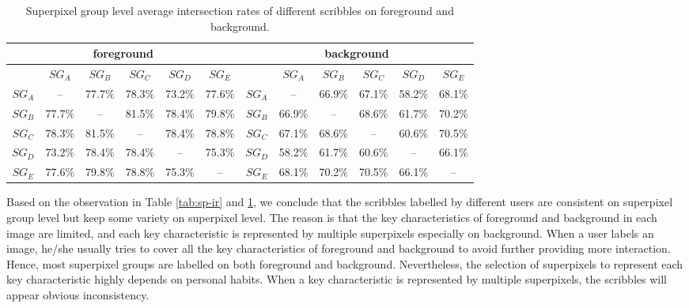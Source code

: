 \documentclass[runningheads,a4paper]{llncs}
\begin{document}
\begin{table}[!h]
\centering
\vspace{-0.2cm}
\caption{Superpixel group level average intersection rates of different scribbles on foreground and background.}
\begin{tabular}{c|c|c|c|c|c||c|c|c|c|c|c}
\hline
\multicolumn{6}{c||}{foreground} &\multicolumn{6}{c}{background}\\
\hline
& $SG_{A}$ & $SG_{B}$ & $SG_{C}$ & $SG_{D}$ & $SG_{E}$ && $SG_{A}$ & $SG_{B}$ & $SG_{C}$ & $SG_{D}$ & $SG_{E}$ \\
\hline
$SG_{A}$ & -- & 77.7\% & 78.3\% & 73.2\% & 77.6\% & $SG_{A}$ & -- & 66.9\% & 67.1\% & 58.2\% & 68.1\% \\
\hline
$SG_{B}$ & 77.7\% & -- & 81.5\% & 78.4\% & 79.8\% & $SG_{B}$ & 66.9\% & -- & 68.6\%& 61.7\% & 70.2\% \\
\hline
$SG_{C}$ & 78.3\% & 81.5\% & -- & 78.4\% & 78.8\% & $SG_{C}$ & 67.1\% & 68.6\% & -- & 60.6\% & 70.5\% \\
\hline
$SG_{D}$ & 73.2\% & 78.4\% & 78.4\% & -- & 75.3\% & $SG_{D}$ & 58.2\% & 61.7\% & 60.6\% & -- & 66.1\% \\
\hline
$SG_{E}$ & 77.6\% & 79.8\% & 78.8\% & 75.3\%& --  & $SG_{E}$ & 68.1\% & 70.2\% & 70.5\% & 66.1\% & --  \\
\hline
\end{tabular}
\label{tab:sg-ir}
\end{table}

Based on the observation in Table \ref{tab:sp-ir} and \ref{tab:sg-ir}, we conclude that the scribbles labelled by different users are consistent on superpixel group level but keep some variety on superpixel level. The reason is that the key characteristics of foreground and background in each image are limited, and each key characteristic is represented by multiple superpixels especially on background. When a user labels an image, he/she usually tries to cover all the key characteristics of foreground and background to avoid further providing more interaction. Hence, most superpixel groups are labelled on both foreground and background. Nevertheless, the selection of superpixels to represent each key characteristic highly depends on personal habits. When a key characteristic is represented by multiple superpixels, the scribbles will appear obvious inconsistency.
\end{document}
